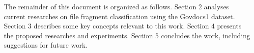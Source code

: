 
The remainder of this document is organized as follows.
    Section 2 analyses current researches on file fragment classification using the Govdocs1 dataset. 
    Section 3 describes some key concepts relevant to this work. 
    Section 4 presents the proposed researches and experiments.
    Section 5 concludes the work, including suggestions for future work.
